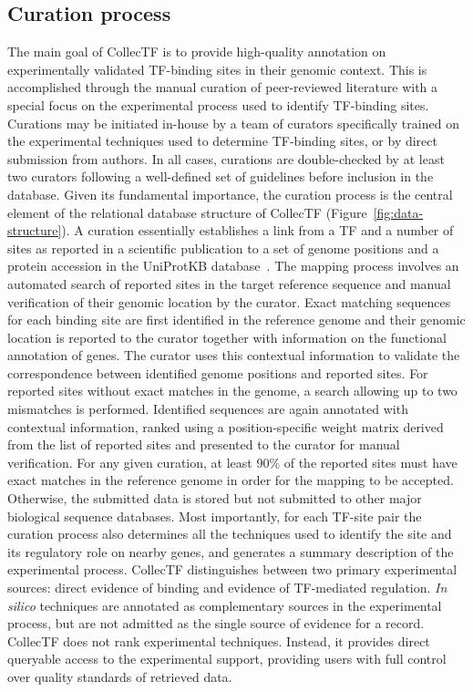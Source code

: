 \subsection{Curation process}


The main goal of CollecTF is to provide high-quality annotation on
experimentally validated TF-binding sites in their genomic context. This is
accomplished through the manual curation of peer-reviewed literature with a
special focus on the experimental process used to identify TF-binding
sites. Curations may be initiated in-house by a team of curators specifically
trained on the experimental techniques used to determine TF-binding sites, or
by direct submission from authors. In all cases, curations are double-checked
by at least two curators following a well-defined set of guidelines before
inclusion in the database. Given its fundamental importance, the curation
process is the central element of the relational database structure of CollecTF
(Figure~\ref{fig:data-structure}). A curation essentially establishes a link
from a TF and a number of sites as reported in a scientific publication to a
set of genome positions and a protein accession in the UniProtKB
database~\citep{uniprot2014uniprot}. The mapping process involves an automated
search of reported sites in the target reference sequence and manual
verification of their genomic location by the curator. Exact matching sequences
for each binding site are first identified in the reference genome and their
genomic location is reported to the curator together with information on the
functional annotation of genes. The curator uses this contextual
information to validate the correspondence between identified genome positions
and reported sites. For reported sites without exact matches in the genome, a
search allowing up to two mismatches is performed. Identified sequences are
again annotated with contextual information, ranked using a position-specific
weight matrix derived from the list of reported sites and presented to the
curator for manual verification. For any given curation, at least 90\% of the
reported sites must have exact matches in the reference genome in order for the
mapping to be accepted. Otherwise, the submitted data is stored but not
submitted to other major biological sequence databases. Most importantly, for
each TF-site pair the curation process also determines all the techniques used
to identify the site and its regulatory role on nearby genes, and generates a
summary description of the experimental process. CollecTF distinguishes between
two primary experimental sources: direct evidence of binding and evidence of
TF-mediated regulation. \textit{In silico} techniques are annotated as complementary
sources in the experimental process, but are not admitted as the single source
of evidence for a record. CollecTF does not rank experimental
techniques. Instead, it provides direct queryable access to the experimental
support, providing users with full control over quality standards of retrieved
data.

